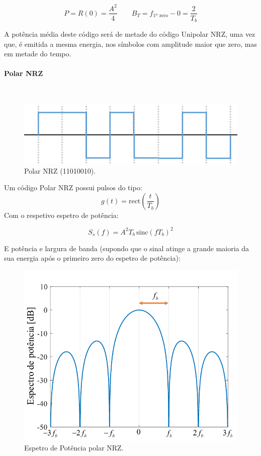 $$
    \boxed{P = R(0) = \frac{A^2}{4}}\qquad
    \boxed{B_T = f_{\text{1º zero}} - 0 = \frac{2}{T_b}}
$$

\noindent A potência média deste código será de metade do código Unipolar NRZ, uma vez que, é emitida a mesma energia, nos símbolos com amplitude maior que zero, mas em metade do tempo.
\clearpage
\paragraph*{Polar NRZ}\mbox{}\\
\label{line:polarNRZ}
\begin{figure}[H]
    \centering
    \includegraphics[width = 0.8\linewidth]{img/digital/line-codes/LPolarNRZ.png}
    \caption{Polar NRZ (11010010).}
    \label{fig:polarNRZ}
\end{figure}
\noindent Um código Polar NRZ possui pulsos do tipo:
$$
    g(t) = \text{rect}\left(\frac{t}{T_b}\right)
$$
\noindent Com o respetivo espetro de potência:

$$
    \boxed{S_s(f) = A^2 T_b\, \text{sinc}(fT_b)^2}
$$

\noindent E potência e largura de banda (supondo que o sinal atinge a grande maioria da sua energia após o primeiro zero do espetro de potência):

\begin{figure}[H]
    \centering
    \includegraphics[width = 0.7\linewidth]{img/digital/line-codes/PPolarNRZ.png}
    \caption{Espetro de Potência polar NRZ.}
    \label{fig:PpolarNRZ}
\end{figure}

